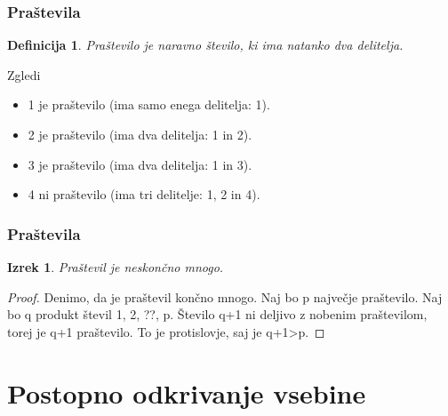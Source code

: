 \documentclass{beamer}
\newtheorem{definicija}{Definicija}
\newtheorem{izrek}{Izrek}
\begin{document}

\begin{frame}
   \frametitle{Praštevila}

   \begin{definicija}
      Praštevilo je naravno število, ki ima natanko dva delitelja.
   \end{definicija}

   \begin{examples}{Zgledi}
      \begin{itemize}
         \item 1 je praštevilo (ima samo enega delitelja: 1).
         \item 2 je praštevilo (ima dva delitelja: 1 in 2).
         \item 3 je praštevilo (ima dva delitelja: 1 in 3).
         \item 4 ni praštevilo (ima tri delitelje: 1, 2 in 4).
      \end{itemize}
   \end{examples}

\end{frame}




\begin{frame}
   \frametitle{Praštevila}

   \begin{izrek}
      Praštevil je neskončno mnogo.
   \end{izrek}

   \begin{proof}
      Denimo, da je praštevil končno mnogo.
         Naj bo p največje praštevilo.
         Naj bo q produkt števil 1, 2, ??, p.
         Število q+1 ni deljivo z nobenim praštevilom, torej je q+1 praštevilo.
         To je protislovje, saj je q+1>p.
   \end{proof}

\end{frame}


\section{Postopno odkrivanje vsebine}
\end{document}
